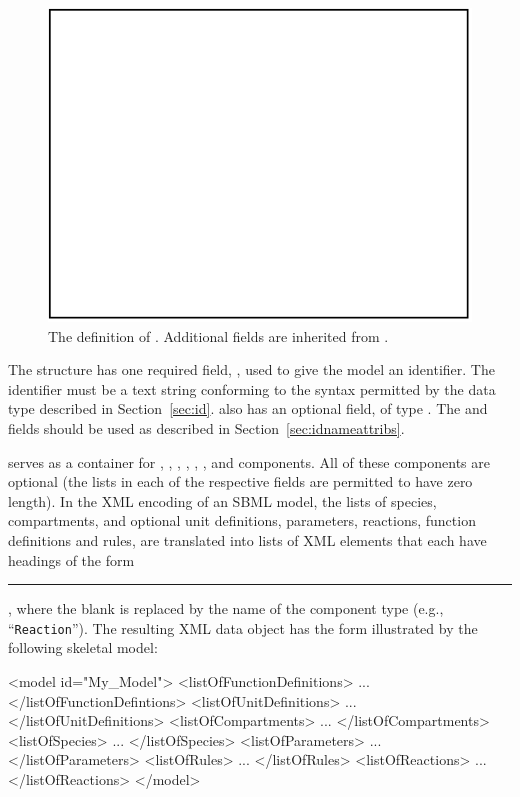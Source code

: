 \documentclass[10pt,twocolumntoc]{cekarticle}
\begin{document}
\begin{figure}[htb]
  \centering
  \includegraphics[scale = 0.68]{model}
  \caption{The definition of .  Additional fields are
    inherited from .}
  \label{fig:model}
\end{figure}

The  structure has one required field, , used to
give the model an identifier.  The identifier must be a text string
conforming to the syntax permitted by the  data type described
in Section~\ref{sec:id}.   also has an optional 
field, of type .  The  and  fields
should be used as described in Section~\ref{sec:idnameattribs}.

 serves as a container for ,
, , ,
, , and  components.  All of
these components are optional (the lists in each of the respective fields
are permitted to have zero length).  In the XML encoding of an SBML model,
the lists of species, compartments, and optional unit definitions,
parameters, reactions, function definitions and rules, are translated into
lists of XML elements that each have headings of the form
\rule{0.5in}{0.5pt}, where the blank is replaced by
the name of the component type (e.g., ``\texttt{Reaction}'').  The
resulting XML data object has the form illustrated by the following
skeletal model:

\begin{example}
<model id="My_Model">
    <listOfFunctionDefinitions>
        ...
    </listOfFunctionDefintions>
    <listOfUnitDefinitions>
        ...
    </listOfUnitDefinitions>
    <listOfCompartments>
        ...
    </listOfCompartments>
    <listOfSpecies>
        ...
    </listOfSpecies>
    <listOfParameters>
        ...
    </listOfParameters>
    <listOfRules>
        ...
    </listOfRules>
    <listOfReactions>
        ...
    </listOfReactions>
</model>
\end{example}
\end{document}
